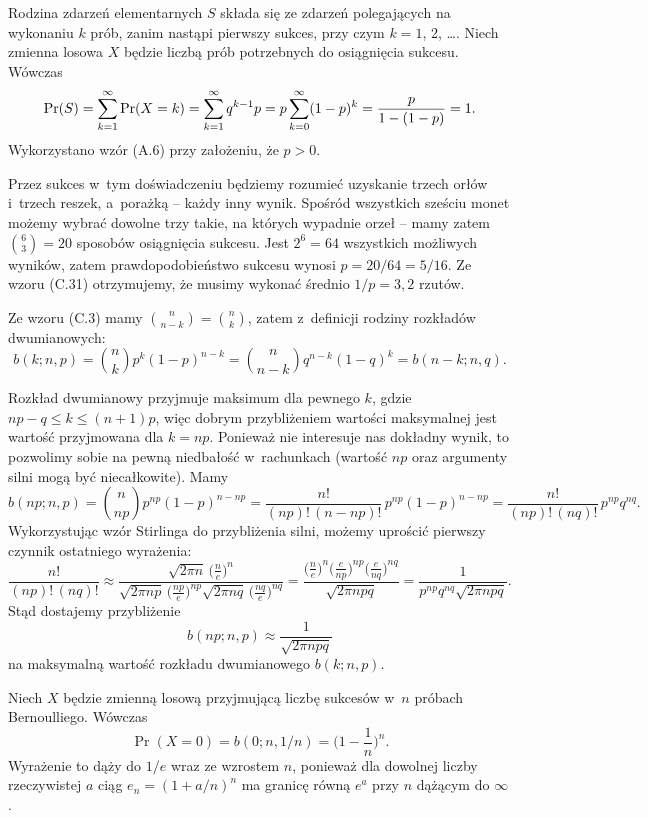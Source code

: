 
\exercise %
Rodzina zdarzeń elementarnych $S$ składa się ze zdarzeń polegających na wykonaniu $k$ prób, zanim nastąpi pierwszy sukces, przy czym $k=1$, 2, \dots.
Niech zmienna losowa $X$ będzie liczbą prób potrzebnych do osiągnięcia sukcesu.
Wówczas
\[
	\Pr(S) = \sum_{k=1}^\infty\Pr(X=k) = \sum_{k=1}^\infty q^{k-1}p = p\sum_{k=0}^\infty(1-p)^k = \frac{p}{1-(1-p)} \\[1mm] = 1.
\]
Wykorzystano wzór (A.6) przy założeniu, że $p>0$.

\exercise %
Przez sukces w~tym doświadczeniu będziemy rozumieć uzyskanie trzech orłów i~trzech reszek, a~porażką -- każdy inny wynik.
Spośród wszystkich sześciu monet możemy wybrać dowolne trzy takie, na których wypadnie orzeł -- mamy zatem $\binom{6}{3}=20$ sposobów osiągnięcia sukcesu.
Jest $2^6=64$ wszystkich możliwych wyników, zatem prawdopodobieństwo sukcesu wynosi $p=20/64=5/16$.
Ze wzoru (C.31) otrzymujemy, że musimy wykonać średnio $1/p=3{,}2$ rzutów.

\exercise %
Ze wzoru (C.3) mamy $\binom{n}{n-k}=\binom{n}{k}$, zatem z~definicji rodziny rozkładów dwumianowych:
\[
	b(k;n,p) = \binom{n}{k}p^k(1-p)^{n-k} = \binom{n}{n-k}q^{n-k}(1-q)^k = b(n-k;n,q).
\]

\exercise %
Rozkład dwumianowy przyjmuje maksimum dla pewnego $k$, gdzie $np-q\le k\le(n+1)p$, więc dobrym przybliżeniem wartości maksymalnej jest wartość przyjmowana dla $k=np$.
Ponieważ nie interesuje nas dokładny wynik, to pozwolimy sobie na pewną niedbałość w~rachunkach (wartość $np$ oraz argumenty silni mogą być niecałkowite).
Mamy
\[
	b(np;n,p) = \binom{n}{np}p^{np}(1-p)^{n-np} = \frac{n!}{(np)!\,(n-np)!}\,p^{np}(1-p)^{n-np} = \frac{n!}{(np)!\,(nq)!}\,p^{np}q^{nq}.
\]
Wykorzystując wzór Stirlinga do przybliżenia silni, możemy uprościć pierwszy czynnik ostatniego wyrażenia:
\[
	\frac{n!}{(np)!\,(nq)!} \approx \frac{\sqrt{2\pi n}\,\bigl(\frac{n}{e}\bigr)^n}{\sqrt{2\pi np}\,\bigl(\frac{np}{e}\bigr)^{np}\sqrt{2\pi nq}\,\bigl(\frac{nq}{e}\bigr)^{nq}} = \frac{\bigl(\frac{n}{e}\bigr)^n\bigl(\frac{e}{np}\bigr)^{np}\bigl(\frac{e}{nq}\bigr)^{nq}}{\sqrt{2\pi npq}} = \frac{1}{p^{np}q^{nq}\sqrt{2\pi npq}}.
\]
Stąd dostajemy przybliżenie
\[
	b(np;n,p) \approx \frac{1}{\sqrt{2\pi npq}}
\]
na maksymalną wartość rozkładu dwumianowego $b(k;n,p)$.

\exercise %
Niech $X$ będzie zmienną losową przyjmującą liczbę sukcesów w~$n$ próbach Bernoulliego.
Wówczas
\[
	\Pr(X=0) = b(0;n,1/n) = \biggl(1-\frac{1}{n}\biggr)^n.
\]
Wyrażenie to dąży do $1/e$ wraz ze wzrostem $n$, ponieważ dla dowolnej liczby rzeczywistej $a$ ciąg $e_n={(1+a/n)}^n$ ma granicę równą $e^a$ przy $n$ dążącym do $\infty$.

